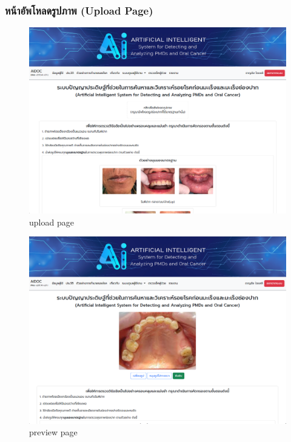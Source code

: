 \subsubsection{หน้าอัพโหลดรูปภาพ (Upload Page)}


\begin{figure}[H]
  \centering
  \includegraphics[scale=0.3]{images/upload_user.png}
  \caption{upload page}
  \label{fig:upload_user}
\end{figure}

\begin{figure}[H]
  \centering
  \includegraphics[scale=0.3]{images/preview_user.png}
  \caption{preview page}
  \label{fig:preview_user}
\end{figure}

